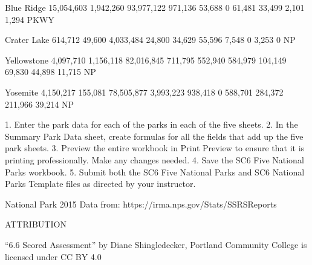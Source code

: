 Blue Ridge
15,054,603   1,942,260    93,977,122   971,136      53,688         0              61,481    33,499    2,101         1,294
PKWY


Crater Lake
614,712      49,600       4,033,484    24,800       34,629         55,596         7,548     0         3,253         0
NP


Yellowstone
4,097,710    1,156,118    82,016,845   711,795      552,940        584,979        104,149   69,830    44,898        11,715
NP


Yosemite
4,150,217    155,081      78,505,877   3,993,223    938,418        0              588,701   284,372   211,966       39,214
NP




1. Enter the park data for each of the parks in each of the five sheets.
2. In the Summary Park Data sheet, create formulas for all the fields that add up the five park
sheets.
3. Preview the entire workbook in Print Preview to ensure that it is printing professionally. Make
any changes needed.
4. Save the SC6 Five National Parks workbook.
5. Submit both the SC6 Five National Parks and SC6 National Parks Template files as directed by
your instructor.

National Park 2015 Data from: https://irma.nps.gov/Stats/SSRSReports

ATTRIBUTION

“6.6 Scored Assessment” by Diane Shingledecker, Portland Community College is licensed under CC
BY 4.0


